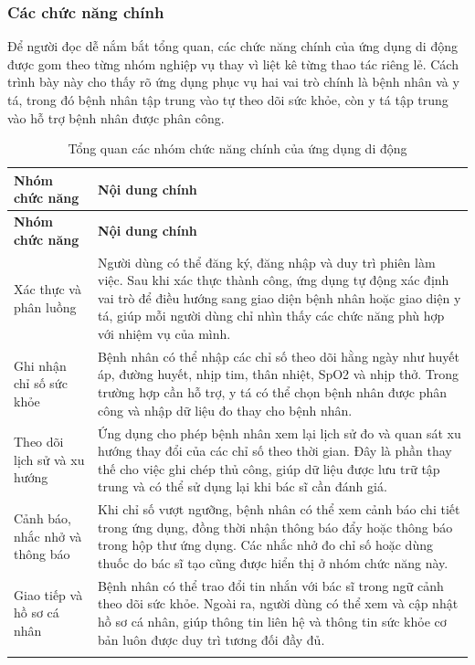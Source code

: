 \subsubsection{Các chức năng chính}
\par Để người đọc dễ nắm bắt tổng quan, các chức năng chính của ứng dụng di động được gom theo từng nhóm nghiệp vụ thay vì liệt kê từng thao tác riêng lẻ. Cách trình bày này cho thấy rõ ứng dụng phục vụ hai vai trò chính là bệnh nhân và y tá, trong đó bệnh nhân tập trung vào tự theo dõi sức khỏe, còn y tá tập trung vào hỗ trợ bệnh nhân được phân công.

\begin{center}
\renewcommand{\arraystretch}{1.25}
\begin{longtable}{|L{4.2cm}|L{10.2cm}|}
    \hline
    \textbf{Nhóm chức năng} & \textbf{Nội dung chính} \\
    \hline
    \endfirsthead
    \hline
    \textbf{Nhóm chức năng} & \textbf{Nội dung chính} \\
    \hline
    \endhead

    Xác thực và phân luồng &
    Người dùng có thể đăng ký, đăng nhập và duy trì phiên làm việc. Sau khi xác thực thành công, ứng dụng tự động xác định vai trò để điều hướng sang giao diện bệnh nhân hoặc giao diện y tá, giúp mỗi người dùng chỉ nhìn thấy các chức năng phù hợp với nhiệm vụ của mình. \\
    \hline

    Ghi nhận chỉ số sức khỏe &
    Bệnh nhân có thể nhập các chỉ số theo dõi hằng ngày như huyết áp, đường huyết, nhịp tim, thân nhiệt, SpO2 và nhịp thở. Trong trường hợp cần hỗ trợ, y tá có thể chọn bệnh nhân được phân công và nhập dữ liệu đo thay cho bệnh nhân. \\
    \hline

    Theo dõi lịch sử và xu hướng &
    Ứng dụng cho phép bệnh nhân xem lại lịch sử đo và quan sát xu hướng thay đổi của các chỉ số theo thời gian. Đây là phần thay thế cho việc ghi chép thủ công, giúp dữ liệu được lưu trữ tập trung và có thể sử dụng lại khi bác sĩ cần đánh giá. \\
    \hline

    Cảnh báo, nhắc nhở và thông báo &
    Khi chỉ số vượt ngưỡng, bệnh nhân có thể xem cảnh báo chi tiết trong ứng dụng, đồng thời nhận thông báo đẩy hoặc thông báo trong hộp thư ứng dụng. Các nhắc nhở đo chỉ số hoặc dùng thuốc do bác sĩ tạo cũng được hiển thị ở nhóm chức năng này. \\
    \hline

    Giao tiếp và hồ sơ cá nhân &
    Bệnh nhân có thể trao đổi tin nhắn với bác sĩ trong ngữ cảnh theo dõi sức khỏe. Ngoài ra, người dùng có thể xem và cập nhật hồ sơ cá nhân, giúp thông tin liên hệ và thông tin sức khỏe cơ bản luôn được duy trì tương đối đầy đủ. \\
    \hline

    \caption{Tổng quan các nhóm chức năng chính của ứng dụng di động}
    \label{chapter3-table-mobile-functions}
\end{longtable}
\end{center}

